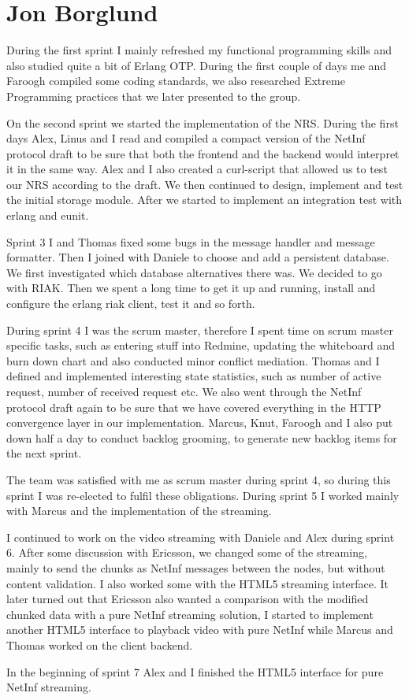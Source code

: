 \section{Jon Borglund}
During the first sprint I mainly refreshed my functional programming skills and also studied quite a bit of Erlang OTP.
During the first couple of days me and Faroogh compiled some coding standards, we also researched Extreme Programming practices that we later presented to the group.

On the second sprint we started the implementation of the NRS. During the first days Alex, Linus and I read and compiled a compact version of the NetInf protocol draft to be sure that both the frontend and the backend would interpret it in the same way. Alex and I also created a curl-script that allowed us to test our NRS according to the draft. 
We then continued to design, implement and test the initial storage module. 
After we started to implement an integration test with erlang and eunit.

Sprint 3 I and Thomas fixed some bugs in the message handler and message formatter. Then I joined with Daniele to choose and add a persistent database. We first investigated which database alternatives there was. We decided to go with RIAK. Then we spent a long time to get it up and running, install and configure the erlang riak client, test it and so forth.

During sprint 4 I was the scrum master, therefore I spent time on scrum master specific tasks, such as entering stuff into Redmine, updating the whiteboard and burn down chart and also conducted minor conflict mediation. 
Thomas and I defined and implemented interesting state statistics, such as number of active request, number of received request etc. We also went through the NetInf protocol draft again to be sure that we have covered everything in the HTTP convergence layer in our implementation.  Marcus, Knut, Faroogh and I also put down half a day to conduct backlog grooming, to generate new backlog items for the next sprint. 

The team was satisfied with me as scrum master during sprint 4, so during this sprint I was re-elected to fulfil these obligations. 
During sprint 5 I worked mainly with Marcus and the implementation of the streaming. 

I continued to work on the video streaming with Daniele and Alex during sprint 6. After some discussion with Ericsson, we changed some of the streaming, mainly to send the chunks as NetInf messages between the nodes, but without content validation. I also worked some with the HTML5 streaming interface. 
It later turned out that Ericsson also wanted a comparison with the modified chunked data with a pure NetInf streaming solution, I started to implement another HTML5 interface to playback video with pure NetInf while Marcus and Thomas worked on the client backend.

In the beginning of sprint 7 Alex and I finished the HTML5 interface for pure NetInf streaming.